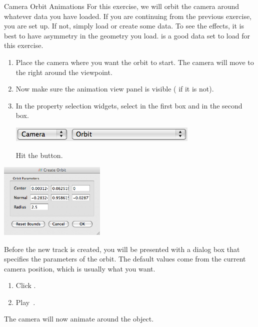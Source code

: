 \begin{exercise}{Camera Orbit Animations}
  \label{ex:CameraOrbitAnimations}%
  For this exercise, we will orbit the camera around whatever data you have
  loaded.  If you are continuing from the previous exercise, you are set
  up.  If not, simply load or create some data.  To see the effects, it is
  best to have asymmetry in the geometry you load.   is a good
  data set to load for this exercise.

  \begin{enumerate}
  \item Place the camera where you want the orbit to start.  The camera
    will move to the right around the viewpoint.
  \item Now make sure the animation view panel is visible ( \ra
     if it is not).
  \item In the property selection widgets, select  in the first
    box and  in the second box.
    \begin{inlinefig}
      \includegraphics[height=1.5\baselineskip]{images/AddCameraOrbit}
    \end{inlinefig}
    Hit the  button.
    \savecounter
  \end{enumerate}

  \begin{inlinefig}
    \includegraphics[width=2in]{images/CreateOrbitDialog}
  \end{inlinefig}

  Before the new track is created, you will be presented with a dialog box
  that specifies the parameters of the orbit.  The default values come from
  the current camera position, which is usually what you want.

  \begin{enumerate}
  \item Click .
  \item Play~\vcrPlay.
  \end{enumerate}

  The camera will now animate around the object.
\end{exercise}


